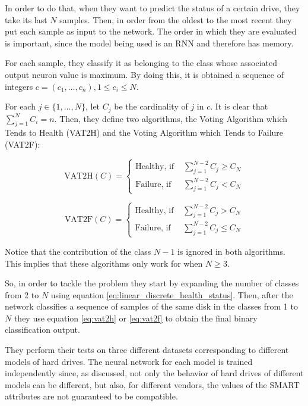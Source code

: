 In order to do that, when they want to predict the status of a certain drive, they take its last $N$ samples.
Then, in order from the oldest to the most recent they put each sample as input to the network.
The order in which they are evaluated is important, since the model being used is an RNN and therefore has memory.

For each sample, they classify it as belonging to the class whose associated output neuron value is maximum.
By doing this, it is obtained a sequence of integers $c = (c_1, \dots, c_n), 1 \leq c_i \leq N$.

For each $j \in \{1,\dots,N\}$, let $C_j$ be the cardinality of $j$ in $c$.
It is clear that $\sum_{j=1}^N C_i = n$.
Then, they define two algorithms, the Voting Algorithm which Tends to Health (VAT2H) and the Voting Algorithm which Tends to Failure (VAT2F):


\begin{equation}\label{eq:vat2h}
    \text{VAT2H}(C) = 
    \begin{cases}
        \text{Healthy, if } & \sum_{j=1}^{N-2}C_j \geq C_N \\
        \text{Failure, if } & \sum_{j=1}^{N-2}C_j < C_N
    \end{cases}
\end{equation}

\begin{equation}\label{eq:vat2f}
    \text{VAT2F}(C) = 
    \begin{cases}
        \text{Healthy, if } & \sum_{j=1}^{N-2}C_j > C_N \\
        \text{Failure, if } & \sum_{j=1}^{N-2}C_j \leq C_N
    \end{cases}
\end{equation}

Notice that the contribution of the class $N-1$ is ignored in both algorithms.
This implies that these algorithms only work for when $N \geq 3$.

So, in order to tackle the problem they start by expanding the number of classes from 2 to $N$ using equation \ref{eq:linear_discrete_health_status}.
Then, after the network classifies a sequence of samples of the same disk in the classes from 1 to $N$ they use equation \ref{eq:vat2h} or \ref{eq:vat2f} to obtain the final binary classification output.

They perform their tests on three different datasets corresponding to different models of hard drives.
The neural network for each model is trained independently since, as discussed, not only the behavior of hard drives of different models can be different, but also, for different vendors, the values of the SMART attributes are not guaranteed to be compatible.


